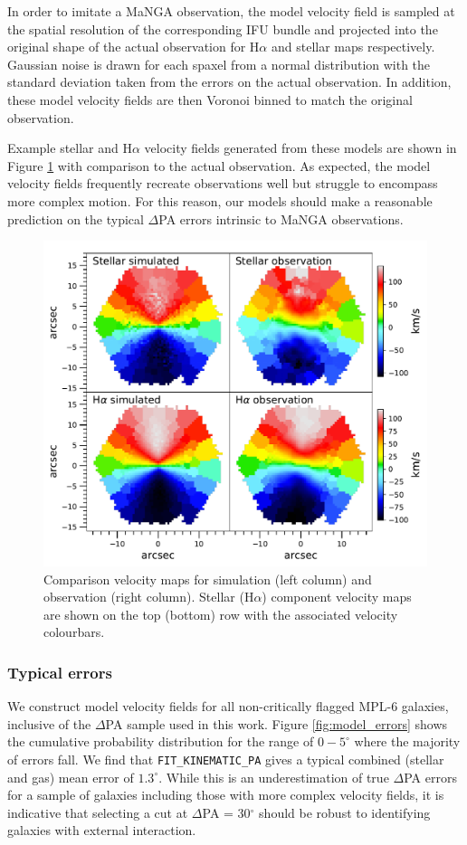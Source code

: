 In order to imitate a MaNGA observation, the model velocity field is sampled at the spatial resolution of the corresponding IFU bundle and projected into the original shape of the actual observation for H$\alpha$ and stellar maps respectively. Gaussian noise is drawn for each spaxel from a normal distribution with the standard deviation taken from the errors on the actual observation. In addition, these model velocity fields are then Voronoi binned to match the original observation.

Example stellar and H$\alpha$ velocity fields generated from these models are shown in Figure \ref{fig:sim_ifu} with comparison to the actual observation. As expected, the model velocity fields frequently recreate observations well but struggle to encompass more complex motion. For this reason, our models should make a reasonable prediction on the typical $\Delta$PA errors intrinsic to MaNGA observations.

\begin{figure}
    \centering
	\includegraphics[width=0.7\linewidth]{thesis/latex/misalignment_MaNGA/obs_sim_IFU.pdf}
    \caption[Comparison velocity maps for simulation (left column) and observation (right column).]{Comparison velocity maps for simulation (left column) and observation (right column). Stellar (H$\alpha$) component velocity maps are shown on the top (bottom) row with the associated velocity colourbars.}
    \label{fig:sim_ifu}
\end{figure}

\subsubsection{Typical errors}
We construct model velocity fields for all non-critically flagged MPL-6 galaxies, inclusive of the $\Delta$PA sample used in this work. Figure \ref{fig:model_errors} shows the cumulative probability distribution for the range of $0-5^{\circ}$ where the majority of errors fall. We find that \texttt{FIT\_KINEMATIC\_PA} gives a typical combined (stellar and gas) mean error of $1.3^{\circ}$. While this is an underestimation of true $\Delta$PA errors for a sample of galaxies including those with more complex velocity fields, it is indicative that selecting a cut at $\Delta$PA = 30$^{\circ}$ should be robust to identifying galaxies with external interaction. 

